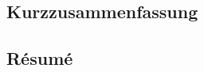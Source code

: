 \begin{otherlanguage}{german}
\cleardoublepage
\chapter*{Kurzzusammenfassung}
\lipsum[1-2]
\end{otherlanguage}




\begin{otherlanguage}{french}
\cleardoublepage
\chapter*{Résumé}
\lipsum[1-2]
\end{otherlanguage}


